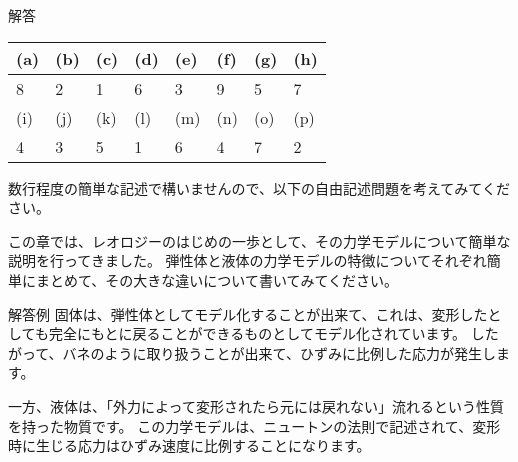 \documentclass[uplatex,dvipdfmx,a4paper,11pt]{jsarticle}
\begin{document}
\begin{qparts}
  \begin{itembox}[l]{解答}
    \begin{center} 
        \begin{tabular}{|p{}|p{}|p{}|p{}|p{}|p{}|p{}|p{}|} \hline
          (a) & (b) & (c) & (d) & (e) & (f) & (g) & (h)\\ \hline
            8 & 2 & 1 & 6 & 3 & 9 & 5 & 7 \\ \hline		
            (i) & (j) & (k) & (l) & (m) & (n) & (o) & (p)\\ \hline
            4 & 3 & 5 & 1 & 6 & 4 & 7 & 2 \\ \hline		
        \end{tabular}
      \end{center}
\end{itembox}

\end{qparts}

数行程度の簡単な記述で構いませんので、以下の自由記述問題を考えてみてください。
\begin{qlist}
\qitem この章では、レオロジーのはじめの一歩として、その力学モデルについて簡単な説明を行ってきました。
弾性体と液体の力学モデルの特徴についてそれぞれ簡単にまとめて、その大きな違いについて書いてみてください。
\end{qlist}

\begin{itembox}[l]{解答例}
    固体は、弾性体としてモデル化することが出来て、これは、変形したとしても完全にもとに戻ることができるものとしてモデル化されています。
    したがって、バネのように取り扱うことが出来て、ひずみに比例した応力が発生します。

    一方、液体は、「外力によって変形されたら元には戻れない」流れるという性質を持った物質です。
    この力学モデルは、ニュートンの法則で記述されて、変形時に生じる応力はひずみ速度に比例することになります。
    \end{itembox}

\clearpage
\end{document}
